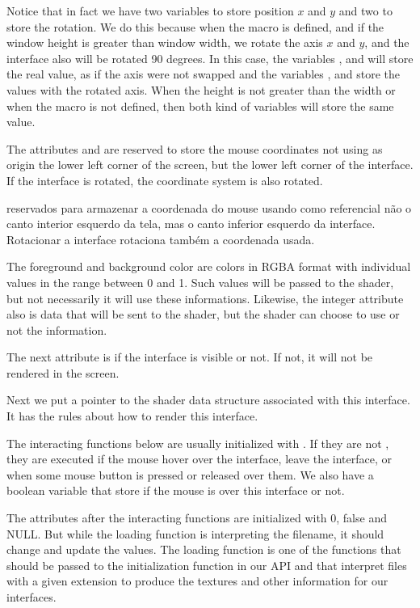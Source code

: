 Notice that in fact we have two variables to store position $x$ and
$y$ and two to store the rotation. We do this because when the
macro  is defined, and if the window
height is greater than window width, we rotate the axis $x$ and $y$,
and the interface also will be rotated 90 degrees. In this case, the
variables , 
and  will store the real value, as if the axis
were not swapped and the variables , 
and  store the values with the rotated axis. When the
height is not greater than the width or when the macro is not defined,
then both kind of variables will store the same value.

The attributes  and  are
reserved to store the mouse coordinates not using as origin the lower
left corner of the screen, but the lower left corner of the
interface. If the interface is rotated, the coordinate system is also
rotated.

reservados para armazenar a coordenada do mouse usando como
referencial não o canto interior esquerdo da tela, mas o canto
inferior esquerdo da interface. Rotacionar a interface rotaciona
também a coordenada usada.


The foreground and background color are colors in RGBA format with
individual values in the range between 0 and 1. Such values will be
passed to the shader, but not necessarily it will use these
informations. Likewise, the integer attribute also is data that will
be sent to the shader, but the shader can choose to use or not the
information.

The next attribute is if the interface is visible or not. If not, it
will not be rendered in the screen.

Next we put a pointer to the shader data structure associated with
this interface. It has the rules about how to render this interface.

The interacting functions below are usually initialized
with . If they are not , they are
executed if the mouse hover over the interface, leave the interface,
or when some mouse button is pressed or released over them. We also
have a boolean variable that store if the mouse is over this interface
or not.

The attributes after the interacting functions are initialized with 0,
false and NULL. But while the loading function is interpreting the
filename, it should change and update the values. The loading function
is one of the functions that should be passed to the initialization
function in our API and that interpret files with a given extension to
produce the textures and other information for our interfaces.

